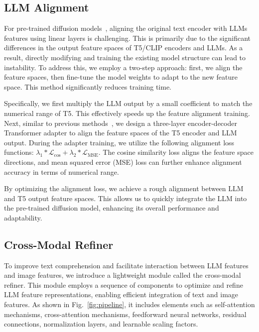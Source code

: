 \subsection{LLM Alignment}




For pre-trained diffusion models~\cite{chen2023pixart,podell2023sdxl}, aligning the original text encoder with LLMs features using linear layers is challenging. This is primarily due to the significant differences in the output feature spaces of T5/CLIP encoders and LLMs. As a result, directly modifying and training the existing model structure can lead to instability. To address this, we employ a two-step approach: first, we align the feature spaces, then fine-tune the model weights to adapt to the new feature space. This method significantly reduces training time.

Specifically, we first multiply the LLM output by a small coefficient to match the numerical range of T5. This effectively speeds up the feature alignment training. Next, similar to previous methods~\cite{tan2024empirical}, we design a three-layer encoder-decoder Transformer adapter to align the feature spaces of the T5 encoder and LLM output. During the adapter training, we utilize the following alignment loss functions: $\lambda_{1}* \mathcal{L}_{\text{cos}} + \lambda_{2}*\mathcal{L}_{\text{MSE}}$. The cosine similarity loss aligns the feature space directions, and mean squared error (MSE) loss can further enhance alignment accuracy in terms of numerical range.

By optimizing the alignment loss, we achieve a rough alignment between LLM and T5 output feature spaces. This allows us to quickly integrate the LLM into the pre-trained diffusion model, enhancing its overall performance and adaptability.




\subsection{Cross-Modal Refiner}


To improve text comprehension and facilitate interaction between LLM features and image features, we introduce a lightweight module called the cross-modal refiner. This module employs a sequence of components to optimize and refine LLM feature representations, enabling efficient integration of text and image features. As shown in Fig.~\ref{fig:pipeline}, it includes elements such as self-attention mechanisms, cross-attention mechanisms, feedforward neural networks, residual connections, normalization layers, and learnable scaling factors.

